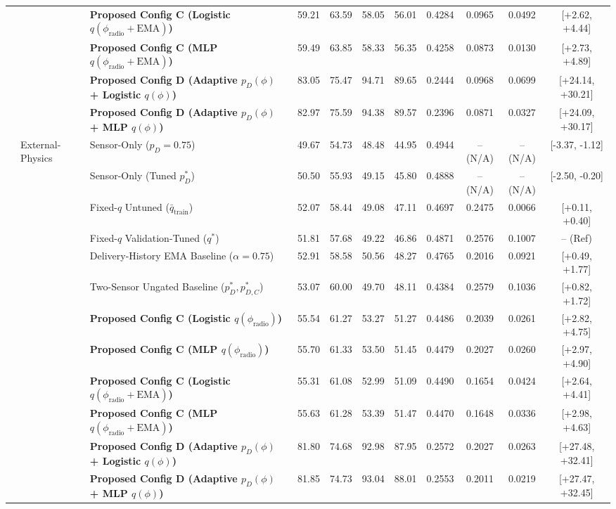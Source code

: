 \begin{table}[!t]
\begin{tabular}{lllcccccccc}
 &  & \textbf{Proposed Config C (Logistic $q(\phi_{\text{radio}}+\text{EMA})$)} & 59.21 & 63.59 & 58.05 & 56.01 & 0.4284 & 0.0965 & 0.0492 & [+2.62, +4.44] \\
 &  & \textbf{Proposed Config C (MLP $q(\phi_{\text{radio}}+\text{EMA})$)} & 59.49 & 63.85 & 58.33 & 56.35 & 0.4258 & 0.0873 & 0.0130 & [+2.73, +4.89] \\
 &  & \textbf{Proposed Config D (Adaptive $p_D(\phi)$ + Logistic $q(\phi)$)} & 83.05 & 75.47 & 94.71 & 89.65 & 0.2444 & 0.0968 & 0.0699 & [+24.14, +30.21] \\
 &  & \textbf{Proposed Config D (Adaptive $p_D(\phi)$ + MLP $q(\phi)$)} & 82.97 & 75.59 & 94.38 & 89.57 & 0.2396 & 0.0871 & 0.0327 & [+24.09, +30.17] \\
\midrule
 & External-Physics & Sensor-Only ($p_D=0.75$) & 49.67 & 54.73 & 48.48 & 44.95 & 0.4944 & -- (N/A) & -- (N/A) & [-3.37, -1.12] \\
 &  & Sensor-Only (Tuned $p_D^*$) & 50.50 & 55.93 & 49.15 & 45.80 & 0.4888 & -- (N/A) & -- (N/A) & [-2.50, -0.20] \\
 &  & Fixed-$q$ Untuned ($\bar{q}_{\text{train}}$) & 52.07 & 58.44 & 49.08 & 47.11 & 0.4697 & 0.2475 & 0.0066 & [+0.11, +0.40] \\
 &  & Fixed-$q$ Validation-Tuned ($q^*$) & 51.81 & 57.68 & 49.22 & 46.86 & 0.4871 & 0.2576 & 0.1007 & -- (Ref) \\
 &  & Delivery-History EMA Baseline ($\alpha=0.75$) & 52.91 & 58.58 & 50.56 & 48.27 & 0.4765 & 0.2016 & 0.0921 & [+0.49, +1.77] \\
 &  & Two-Sensor Ungated Baseline ($p_D^*, p_{D,C}^*$) & 53.07 & 60.00 & 49.70 & 48.11 & 0.4384 & 0.2579 & 0.1036 & [+0.82, +1.72] \\
 &  & \textbf{Proposed Config C (Logistic $q(\phi_{\text{radio}})$)} & 55.54 & 61.27 & 53.27 & 51.27 & 0.4486 & 0.2039 & 0.0261 & [+2.82, +4.75] \\
 &  & \textbf{Proposed Config C (MLP $q(\phi_{\text{radio}})$)} & 55.70 & 61.33 & 53.50 & 51.45 & 0.4479 & 0.2027 & 0.0260 & [+2.97, +4.90] \\
 &  & \textbf{Proposed Config C (Logistic $q(\phi_{\text{radio}}+\text{EMA})$)} & 55.31 & 61.08 & 52.99 & 51.09 & 0.4490 & 0.1654 & 0.0424 & [+2.64, +4.41] \\
 &  & \textbf{Proposed Config C (MLP $q(\phi_{\text{radio}}+\text{EMA})$)} & 55.63 & 61.28 & 53.39 & 51.47 & 0.4470 & 0.1648 & 0.0336 & [+2.98, +4.63] \\
 &  & \textbf{Proposed Config D (Adaptive $p_D(\phi)$ + Logistic $q(\phi)$)} & 81.80 & 74.68 & 92.98 & 87.95 & 0.2572 & 0.2027 & 0.0263 & [+27.48, +32.41] \\
 &  & \textbf{Proposed Config D (Adaptive $p_D(\phi)$ + MLP $q(\phi)$)} & 81.85 & 74.73 & 93.04 & 88.01 & 0.2553 & 0.2011 & 0.0219 & [+27.47, +32.45] \\
\bottomrule
\end{tabular}
\end{table}